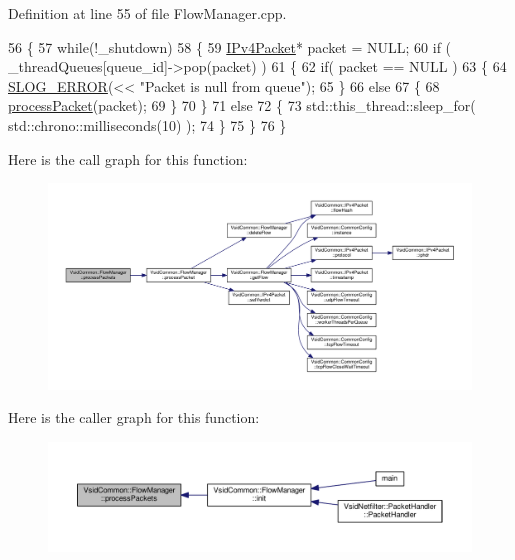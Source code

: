 Definition at line 55 of file Flow\-Manager.\-cpp.


\begin{DoxyCode}
56 \{
57     \textcolor{keywordflow}{while}(!\_shutdown)
58     \{
59         \hyperlink{class_vsid_common_1_1_i_pv4_packet}{IPv4Packet}* packet = NULL;
60         \textcolor{keywordflow}{if} ( \_threadQueues[queue\_id]->pop(packet) )
61         \{
62             \textcolor{keywordflow}{if}( packet == NULL )
63             \{
64                 \hyperlink{_logger_8h_a2a8694cd392d18f4db6b9cc9f15bafe3}{SLOG\_ERROR}(<< \textcolor{stringliteral}{"Packet is null from queue"});
65             \}
66             \textcolor{keywordflow}{else}
67             \{
68                 \hyperlink{class_vsid_common_1_1_flow_manager_a1771b987b5c030b6561713781fe90587}{processPacket}(packet);
69             \}
70         \}
71         \textcolor{keywordflow}{else}
72         \{
73             std::this\_thread::sleep\_for( std::chrono::milliseconds(10) );
74         \}
75     \}
76 \}
\end{DoxyCode}


Here is the call graph for this function\-:
\nopagebreak
\begin{figure}[H]
\begin{center}
\leavevmode
\includegraphics[width=350pt]{class_vsid_common_1_1_flow_manager_a73e959f27b2b196694b94cb73b09143d_cgraph}
\end{center}
\end{figure}




Here is the caller graph for this function\-:
\nopagebreak
\begin{figure}[H]
\begin{center}
\leavevmode
\includegraphics[width=350pt]{class_vsid_common_1_1_flow_manager_a73e959f27b2b196694b94cb73b09143d_icgraph}
\end{center}
\end{figure}



